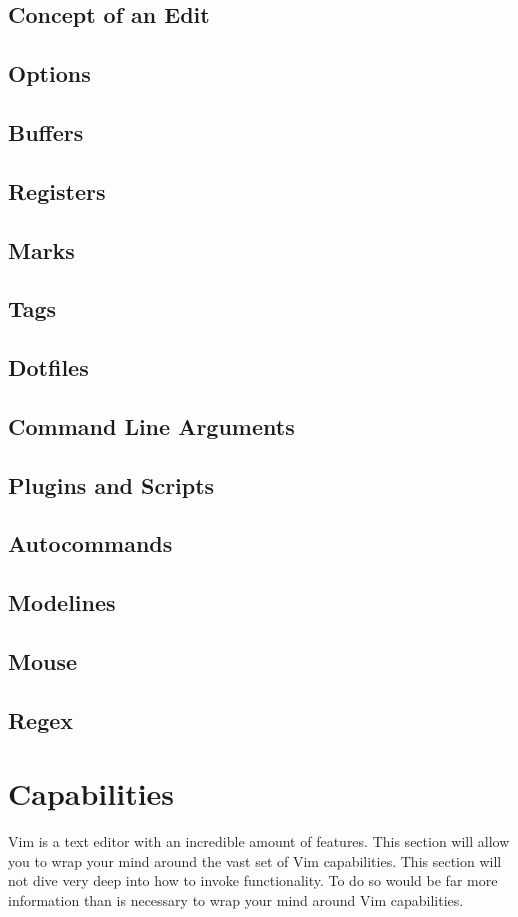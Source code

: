 \documentclass[12pt, oneside]{book}
\begin{document}
\section{Concept of an Edit}
\section{Options}
\section{Buffers}
\section{Registers}
\section{Marks}
\section{Tags}
\section{Dotfiles}
\section{Command Line Arguments}
\section{Plugins and Scripts}
\section{Autocommands}
\section{Modelines}
\section{Mouse}
\section{Regex}

\chapter{Capabilities}
Vim is a text editor with an incredible amount of features.  This section will allow you to wrap your mind around the vast set of Vim capabilities.  This section will not dive very deep into how to invoke
functionality.  To do so would be far more information than is necessary to wrap your mind around Vim capabilities.
\end{document}
